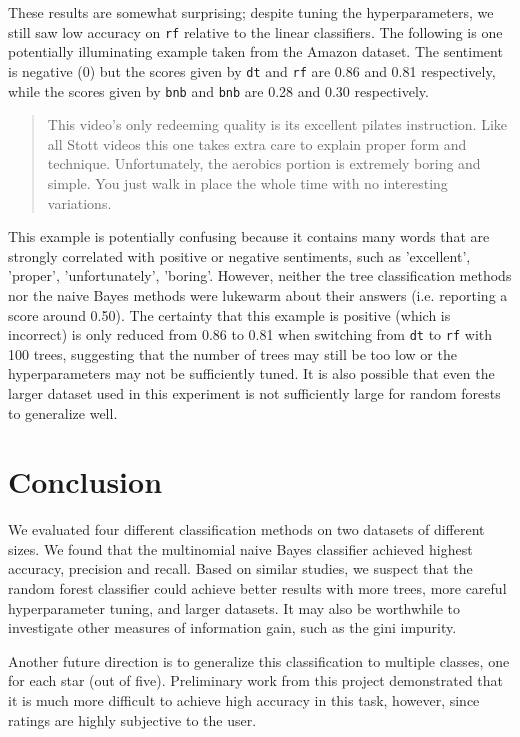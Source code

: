 \documentclass{article} %
\begin{document}
These results are somewhat surprising; despite tuning the hyperparameters, we still saw low accuracy on \texttt{rf} relative to the linear classifiers. The following is one potentially illuminating example taken from the Amazon dataset. The sentiment is negative (0) but the scores given by \texttt{dt} and \texttt{rf} are 0.86 and 0.81 respectively, while the scores given by \texttt{bnb} and \texttt{bnb} are 0.28 and 0.30 respectively.

\begin{quote}
This video's only redeeming quality is its excellent pilates instruction. Like all Stott videos this one takes extra care to explain proper form and technique. Unfortunately, the aerobics portion is extremely boring and simple. You just walk in place the whole time with no interesting variations.
\end{quote}

This example is potentially confusing because it contains many words that are strongly correlated with positive or negative sentiments, such as 'excellent', 'proper', 'unfortunately', 'boring'. However, neither the tree classification methods nor the naive Bayes methods were lukewarm about their answers (i.e. reporting a score around 0.50). The certainty that this example is positive (which is incorrect) is only reduced from 0.86 to 0.81 when switching from \texttt{dt} to \texttt{rf} with 100 trees, suggesting that the number of trees may still be too low or the hyperparameters may not be sufficiently tuned. It is also possible that even the larger dataset used in this experiment is not sufficiently large for random forests to generalize well.

\section{Conclusion}

We evaluated four different classification methods on two datasets of different sizes. We found that the multinomial naive Bayes classifier achieved highest accuracy, precision and recall. Based on similar studies, we suspect that the random forest classifier could achieve better results with more trees, more careful hyperparameter tuning, and larger datasets. It may also be worthwhile to investigate other measures of information gain, such as the gini impurity.

Another future direction is to generalize this classification to multiple classes, one for each star (out of five). Preliminary work from this project demonstrated that it is much more difficult to achieve high accuracy in this task, however, since ratings are highly subjective to the user.
\end{document}
